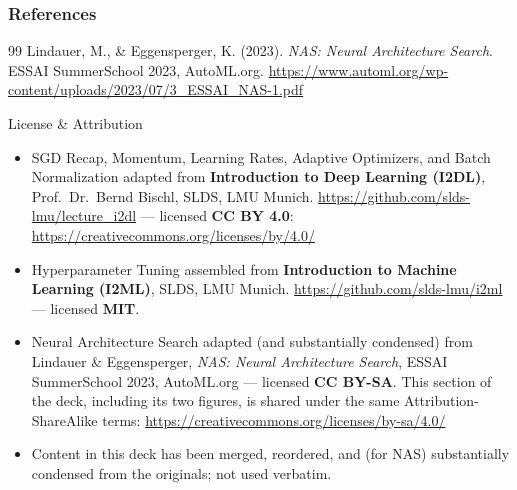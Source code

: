 \begin{vbframe}
\frametitle{References}
\footnotesize{
\begin{thebibliography}{99}
 Lindauer, M., \&
Eggensperger, K. (2023). \textit{NAS: Neural Architecture Search}. ESSAI
SummerSchool 2023, AutoML.org.
\url{https://www.automl.org/wp-content/uploads/2023/07/3_ESSAI_NAS-1.pdf}
\end{thebibliography}
}
\end{vbframe}

\begin{vbframe}{License \& Attribution}
\begin{itemize}
\item SGD Recap, Momentum, Learning Rates, Adaptive Optimizers, and Batch Normalization
adapted from \textbf{Introduction to Deep Learning (I2DL)}, Prof.\ Dr.\
Bernd Bischl, SLDS, LMU Munich. \url{https://github.com/slds-lmu/lecture_i2dl}
--- licensed \textbf{CC BY 4.0}: \url{https://creativecommons.org/licenses/by/4.0/}
\item Hyperparameter Tuning assembled from \textbf{Introduction to Machine
Learning (I2ML)}, SLDS, LMU Munich. \url{https://github.com/slds-lmu/i2ml}
--- licensed \textbf{MIT}.
\item Neural Architecture Search adapted (and substantially condensed) from
Lindauer \& Eggensperger, \textit{NAS: Neural Architecture Search}, ESSAI
SummerSchool 2023, AutoML.org --- licensed \textbf{CC BY-SA}. This section
of the deck, including its two figures, is shared under the same
Attribution-ShareAlike terms: \url{https://creativecommons.org/licenses/by-sa/4.0/}
\item Content in this deck has been merged, reordered, and (for NAS)
substantially condensed from the originals; not used verbatim.
\end{itemize}
\end{vbframe}

\endlecture

